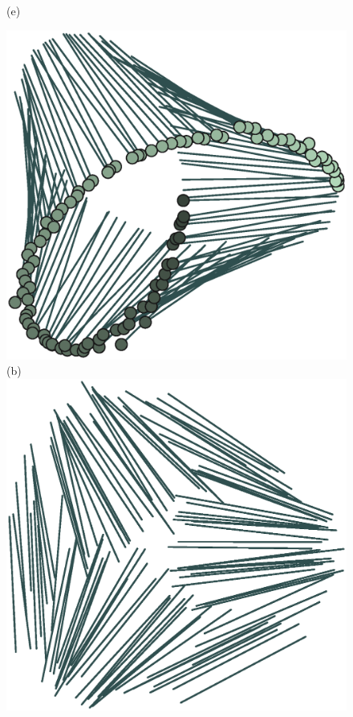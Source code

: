 \begin{figure}[!t]
\begin{minipage}[t]{0.25\textwidth}
		(e)
	\end{minipage}%
	\begin{minipage}[t]{0.25\textwidth}
		\centering
		\includegraphics[width=0.9\columnwidth]{./figs/minushalf_reruns_0.eps}\\
		(b)\\ \vspace{0.5cm}
		\includegraphics[width=0.9\columnwidth]{./figs/minushalf_reruns_1.eps}\\

\end{minipage}
\end{figure}
